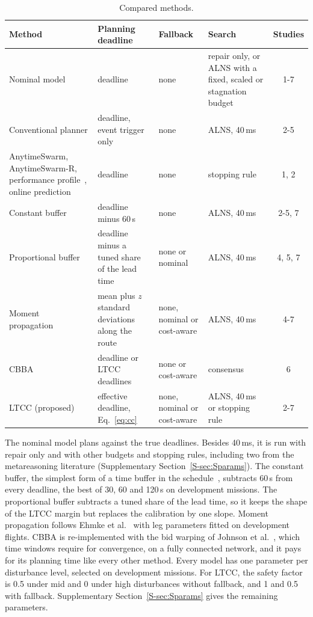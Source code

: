 \documentclass[a4paper,fleqn]{cas-dc}
\newcommand{\mname}{LTCC}  %
\newcounter{prop}
\begin{document}
\begin{table}[t]
\caption{Compared methods.}\label{tab:methods}
\centering\footnotesize
\setlength{\tabcolsep}{4pt}
\begin{tabular}{@{}>{\raggedright\arraybackslash}p{3.8cm}>{\raggedright\arraybackslash}p{4.6cm}%
>{\raggedright\arraybackslash}p{2.8cm}>{\raggedright\arraybackslash}p{4.1cm}c@{}}
\toprule
Method & Planning deadline & Fallback & Search & Studies \\
\midrule
Nominal model~\cite{ropke2006adaptive} & deadline & none & repair only, or ALNS with a fixed, scaled or stagnation budget & 1-7 \\
Conventional planner & deadline, event trigger only & none & ALNS, 40\,ms & 2-5 \\
AnytimeSwarm, AnytimeSwarm-R, performance profile~\cite{boddy1994deliberation,zilberstein1996using}, online prediction~\cite{svegliato2018meta} & deadline & none & stopping rule & 1, 2 \\
Constant buffer~\cite{jabali2015selfimposed} & deadline minus 60\,s & none & ALNS, 40\,ms & 2-5, 7 \\
Proportional buffer & deadline minus a tuned share of the lead time & none or nominal & ALNS, 40\,ms & 4, 5, 7 \\
Moment propagation~\cite{ehmke2015ensuring} & mean plus $z$ standard deviations along the route & none, nominal or cost-aware & ALNS, 40\,ms & 4-7 \\
CBBA~\cite{choi2009consensus,johnson2012nonsubmodular} & deadline or \mname{} deadlines & none or cost-aware & consensus & 6 \\
\mname{} (proposed) & effective deadline, Eq.~\eqref{eq:cc} & none, nominal or cost-aware & ALNS, 40\,ms or stopping rule & 2-7 \\
\bottomrule
\end{tabular}
\end{table}

The nominal model plans against the true deadlines. Besides 40\,ms, it is run with repair only and with other budgets
and stopping rules, including two from the metareasoning literature (Supplementary Section~\ref{S-sec:Sparams}). The
constant buffer, the simplest form of a time buffer in the
schedule~\cite{jabali2015selfimposed}, subtracts 60\,s from every deadline, the best of 30, 60 and 120\,s on
development missions. The proportional buffer subtracts a tuned share of the
lead time, so it keeps the shape of the \mname{} margin but replaces the calibration by one slope. Moment propagation
follows Ehmke et al.~\cite{ehmke2015ensuring} with leg parameters fitted on development flights. CBBA is
re-implemented with the bid warping of Johnson et al.~\cite{johnson2012nonsubmodular}, which time windows require for
convergence, on a fully connected network, and it pays for its planning time like every other method. Every model has
one parameter per disturbance level, selected on development missions. For \mname{}, the safety factor is 0.5 under
mid and 0 under high disturbances without fallback, and 1 and 0.5 with fallback. Supplementary
Section~\ref{S-sec:Sparams} gives the remaining parameters.
\end{document}
